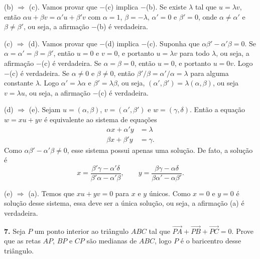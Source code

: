 \documentclass[a4paper,11pt]{article}
\begin{document}
(b) $\Rightarrow$ (c).
Vamos provar que $-$(c) implica $-$(b).
Se existe $\lambda$ tal que $u = \lambda v$, então $\alpha u + \beta v = \alpha' u + \beta' v$ com $\alpha = 1$, $\beta = -\lambda$, $\alpha' = 0$ e $\beta' = 0$, onde $\alpha \neq \alpha'$ e $\beta \neq \beta'$, ou seja, a afirmação $-$(b) é verdadeira.

(c) $\Rightarrow$ (d).
Vamos provar que $-$(d) implica $-$(c).
Suponha que $\alpha \beta' - \alpha' \beta = 0$.
Se $\alpha = \alpha' = \beta = \beta'$, então $u = 0$ e $v = 0$, e portanto $u = \lambda v$ para todo $\lambda$, ou seja, a afirmação $-$(c) é verdadeira.
Se $\alpha = \beta = 0$, então $u = 0$, e portanto $u = 0v$.
Logo $-$(c) é verdadeira.
Se $\alpha \neq 0$ e $\beta \neq 0$, então $\beta'/\beta = \alpha'/\alpha = \lambda$ para alguma constante $\lambda$.
Logo $\alpha' = \lambda \alpha$ e $\beta' = \lambda \beta$, ou seja, $(\alpha', \beta') = \lambda (\alpha, \beta)$, ou seja $v = \lambda u$, ou seja, a afirmação $-$(c) é verdadeira.

(d) $\Rightarrow$ (e).
Sejam $u = (\alpha,\beta)$, $v = (\alpha',\beta')$ e $w = (\gamma,\delta)$.
Então a equação $w = xu + yv$ é equivalente ao sistema de equações
\begin{align*}
  \alpha x + \alpha' y & = \lambda \\
  \beta x + \beta' y & = \gamma.
\end{align*}
Como $\alpha \beta' - \alpha' \beta \neq 0$, esse sistema possui apenas uma solução.
De fato, a solução é
\[
  x = \frac{\beta' \gamma - \alpha' \delta}{\beta' \alpha - \alpha' \beta}, \qquad y = \frac{\beta \gamma - \alpha \delta}{\beta \alpha' - \alpha \beta'}.
\]

(e) $\Rightarrow$ (a).
Temos que $xu + yv = 0$ para $x$ e $y$ únicos.
Como $x = 0$ e $y = 0$ é solução desse sistema, essa deve ser a única solução, ou seja, a afirmação (a) é verdadeira.

\vspace{\baselineskip}

\textbf{7.}
Seja $P$ um ponto interior ao triângulo $ABC$ tal que $\overrightarrow{PA} \!+\! \overrightarrow{PB} + \overrightarrow{PC} = 0$.
Prove que as retas $AP$, $BP$ e $CP$ são medianas de $ABC$, logo $P$ é o ba\-ri\-cen\-tro desse triângulo.

\vspace{\baselineskip}
\end{document}
